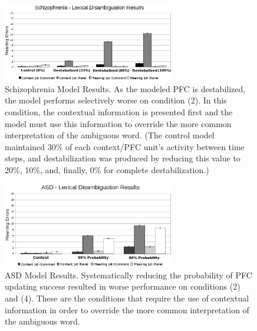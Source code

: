 \begin{figure}[tp]
\begin{center}
	\includegraphics[width=75mm]{figures/schiz_lexamb_results.eps}
\end{center}
\caption{Schizophrenia Model Results. As the modeled PFC is destabilized, the model performs selectively worse on condition (2).  In this condition, the contextual information is presented first and the model must use this information to override the more common interpretation of the ambiguous word. (The control model maintained 30\% of each context/PFC unit's activity between time steps, and destabilization was produced by reducing this value to 20\%, 10\%, and, finally, 0\% for complete destabilization.)} 
\label{Schiz-Amb-Results}
\end{figure} 

\begin{figure}[tp]
\begin{center}
	\includegraphics[width=75mm]{figures/asd_lexamb_results.eps}
\end{center}
\caption{ASD Model Results. Systematically reducing the probability of PFC updating success resulted in worse performance on conditions (2) and (4). These are the conditions that require the use of contextual information in order to override the more common interpretation of the ambiguous word.} 
\label{ASD-Amb-Results}
\end{figure} 

